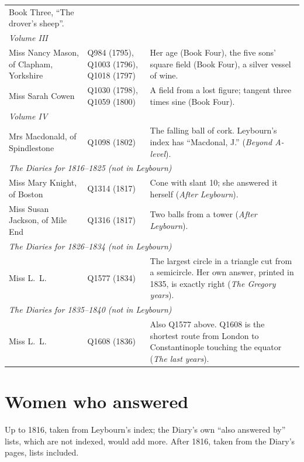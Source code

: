 \documentclass[11pt,a4paper]{article}
\begin{document}
\begin{longtable}{p{4.2cm} p{2.8cm} p{8.2cm}}
  Book Three, ``The drover's sheep''.\\[4pt]
\multicolumn{3}{l}{\textit{Volume III}}\\
Miss Nancy Mason, of Clapham, Yorkshire & Q984 (1795), Q1003 (1796), Q1018 (1797) & Her age (Book
  Four), the five sons' square field (Book Four), a silver vessel of wine.\\
Miss Sarah Cowen & Q1030 (1798), Q1059 (1800) & A field from a lost figure; tangent three
  times sine (Book Four).\\[4pt]
\multicolumn{3}{l}{\textit{Volume IV}}\\
Mrs Macdonald, of Spindlestone & Q1098 (1802) & The falling ball of cork. Leybourn's index
  has ``Macdonal, J.'' (\textit{Beyond A-level}).\\[4pt]
\multicolumn{3}{l}{\textit{The Diaries for 1816--1825 (not in Leybourn)}}\\
Miss Mary Knight, of Boston & Q1314 (1817) & Cone with slant 10; she answered it herself
  (\textit{After Leybourn}).\\
Miss Susan Jackson, of Mile End & Q1316 (1817) & Two balls from a tower
  (\textit{After Leybourn}).\\[4pt]
\multicolumn{3}{l}{\textit{The Diaries for 1826--1834 (not in Leybourn)}}\\
Miss L.~L. & Q1577 (1834) & The largest circle in a triangle cut from a semicircle. Her
  own answer, printed in 1835, is exactly right (\textit{The Gregory years}).\\[4pt]
\multicolumn{3}{l}{\textit{The Diaries for 1835--1840 (not in Leybourn)}}\\
Miss L.~L. & Q1608 (1836) & Also Q1577 above. Q1608 is the shortest route from London to
  Constantinople touching the equator (\textit{The last years}).\\
\bottomrule
\end{longtable}

\section*{Women who answered}

Up to 1816, taken from Leybourn's index; the Diary's own ``also answered by'' lists,
which are not indexed, would add more. After 1816, taken from the Diary's pages, lists
included.
\end{document}
